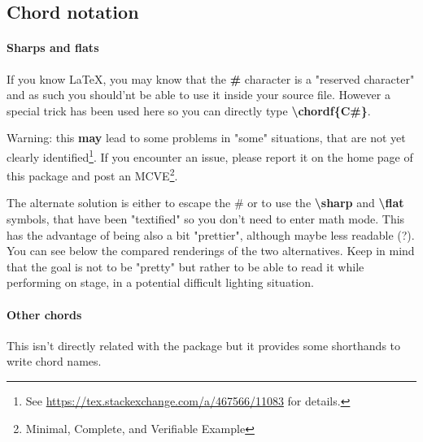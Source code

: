 \documentclass[11pt]{article}
\newcommand{\btt}{\bfseries \ttfamily }
\newcommand{\tbs}{\textbackslash{}}
\begin{document}
\subsection{Chord notation}

\paragraph{Sharps and flats}

If you know \LaTeX, you may know that the {\btt \#} character is a "reserved character" and as such you should'nt be able to use it inside your source file.
However a special trick has been used here so you can directly type {\btt \tbs chordf\{C\#\}}.

Warning: this {\bf may} lead to some problems in "some" situations, that are not yet clearly identified\footnote{See \url{https://tex.stackexchange.com/a/467566/11083} for details.}.
If you encounter an issue, please report it on the home page of this package and post an MCVE\footnote{Minimal, Complete, and Verifiable Example}.

The alternate solution is either to escape the \# or to use the {\btt \tbs sharp} and {\btt \tbs flat} symbols, that have been "textified" so you don't need to enter math mode.
This has the advantage of being also a bit "prettier", although maybe less readable (?).
You can see below the compared renderings of the two alternatives.
Keep in mind that the goal is not to be "pretty" but rather to be able to read it while performing on stage, in a potential difficult lighting situation.

\vspace{1em}

\noindent
\begin{minipage}{0.6\textwidth}

\end{minipage}
%
\begin{minipage}{0.3\textwidth}
\def\chordFontSize{\Huge\bfseries}
\resetchordbars
\countbarsNo

\end{minipage}

\paragraph{Other chords}
This isn't directly related with the package but it provides some shorthands to write chord names.
\end{document}
